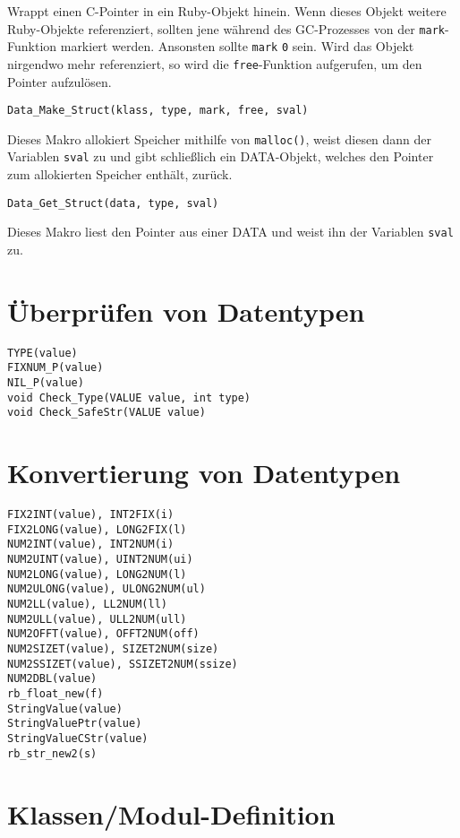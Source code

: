 \noindent Wrappt einen C-Pointer in ein Ruby-Objekt hinein. Wenn
dieses Objekt weitere Ruby-Objekte referenziert, sollten jene während
des GC-Prozesses von der \verb+mark+-Funktion markiert werden.
Ansonsten sollte \verb+mark+ \verb+0+ sein. Wird das Objekt nirgendwo
mehr referenziert, so wird die \verb+free+-Funktion aufgerufen, um den
Pointer aufzulösen.

\begin{lstlisting}
Data_Make_Struct(klass, type, mark, free, sval)
\end{lstlisting}

\noindent Dieses Makro allokiert Speicher mithilfe von
\verb+malloc()+, weist diesen dann der Variablen \verb+sval+ zu und
gibt schließlich ein DATA-Objekt, welches den Pointer zum allokierten
Speicher enthält, zurück.

\begin{lstlisting}
Data_Get_Struct(data, type, sval)
\end{lstlisting}

\noindent Dieses Makro liest den Pointer aus einer DATA und weist ihn
der Variablen \verb+sval+ zu.

\section{Überprüfen von Datentypen}
\label{sec:api:datentypen}

\begin{lstlisting}
TYPE(value)
FIXNUM_P(value)
NIL_P(value)
void Check_Type(VALUE value, int type)
void Check_SafeStr(VALUE value)
\end{lstlisting}

\section{Konvertierung von Datentypen}
\label{sec:api-konvertieren}

\begin{lstlisting}
FIX2INT(value), INT2FIX(i)
FIX2LONG(value), LONG2FIX(l)
NUM2INT(value), INT2NUM(i)
NUM2UINT(value), UINT2NUM(ui)
NUM2LONG(value), LONG2NUM(l)
NUM2ULONG(value), ULONG2NUM(ul)
NUM2LL(value), LL2NUM(ll)
NUM2ULL(value), ULL2NUM(ull)
NUM2OFFT(value), OFFT2NUM(off)
NUM2SIZET(value), SIZET2NUM(size)
NUM2SSIZET(value), SSIZET2NUM(ssize)
NUM2DBL(value)
rb_float_new(f)
StringValue(value)
StringValuePtr(value)
StringValueCStr(value)
rb_str_new2(s)
\end{lstlisting}

\section{Klassen/Modul-Definition}
\label{sec:api-classmod}

